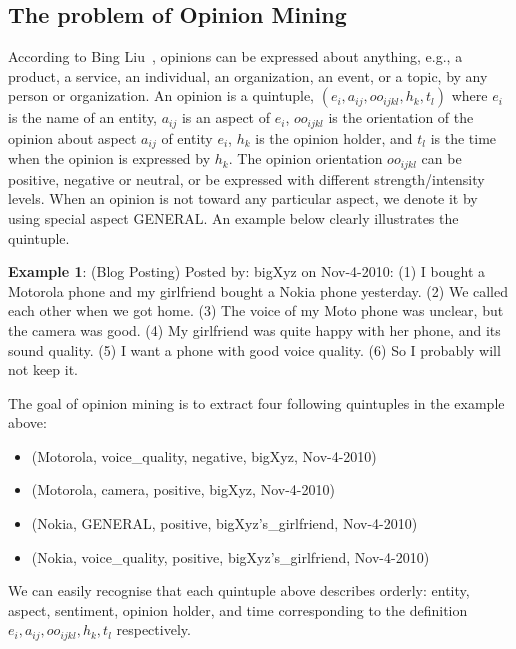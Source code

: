 \documentclass{article}
\begin{document}
\label{sec:sabackground}
\subsection{The problem of Opinion Mining}
According to Bing Liu~\cite{Liu2012}, opinions can be expressed about anything, e.g., a product, a service, an individual, an organization, an event, or a topic, by any person or organization.
An opinion is a quintuple, $(e_i, a_{ij}, oo_{ijkl}, h_k, t_l)$ where $e_i$ is the name of an entity, $a_{ij}$ is an aspect of $e_i$, $oo_{ijkl}$ is the orientation of the opinion about aspect $a_{ij}$ of entity $e_i$, $h_k$ is the opinion holder, and $t_l$ is the time when the opinion is expressed by $h_k$. 
The opinion orientation $oo_{ijkl}$ can be positive, negative or neutral, or be expressed with different strength/intensity levels. 
When an opinion is not toward any particular aspect, we denote it by using special aspect GENERAL.
An example below clearly illustrates the quintuple.

\textbf{Example 1}:
(Blog Posting) Posted by: bigXyz on Nov-4-2010: 
(1) I bought a Motorola phone and my girlfriend bought a Nokia phone yesterday. 
(2) We called each other when we got home. 
(3) The voice of my Moto phone was unclear, but the camera was good. 
(4) My girlfriend was quite happy with her phone, and its sound quality. 
(5) I want a phone with good voice quality. 
(6) So I probably will not keep it.

The goal of opinion mining is to extract four following quintuples in the example above:
\begin{itemize}
    \item (Motorola, voice\_quality, negative, bigXyz, Nov-4-2010)
    \item (Motorola, camera, positive, bigXyz, Nov-4-2010)
    \item (Nokia, GENERAL, positive, bigXyz's\_girlfriend, Nov-4-2010)
    \item (Nokia, voice\_quality, positive, bigXyz's\_girlfriend, Nov-4-2010)
\end{itemize}
We can easily recognise that each quintuple above describes orderly: entity, aspect, sentiment, opinion holder, and time corresponding to the definition $e_i, a_{ij}, oo_{ijkl}, h_k, t_l$ respectively. 
\end{document}
